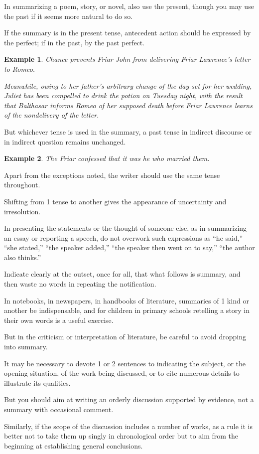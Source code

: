 \documentclass{book}
\numberwithin{equation}{section}
\newtheorem{example}{Example}[chapter]
\begin{document}
In summarizing a poem, story, or novel, also use the present, though you may use the past if it seems more natural to do so.

If the summary is in the present tense, antecedent action should be expressed by the perfect; if in the past, by the past perfect.
\begin{example}
    Chance prevents Friar John from delivering Friar Lawrence's letter to Romeo.
    
    Meanwhile, owing to her father's arbitrary change of the day set for her wedding, Juliet has been compelled to drink the potion on Tuesday night, with the result that Balthasar informs Romeo of her supposed death before Friar Lawrence learns of the nondelivery of the letter.
\end{example}
But whichever tense is used in the summary, a past tense in indirect discourse or in indirect question remains unchanged.
\begin{example}
    The Friar confessed that it was he who married them.
\end{example}
Apart from the exceptions noted, the writer should use the same tense throughout.

Shifting from 1 tense to another gives the appearance of uncertainty and irresolution.

%
In presenting the statements or the thought of someone else, as in summarizing an essay or reporting a speech, do not overwork such expressions as ``he said,'' ``she stated,'' ``the speaker added,'' ``the speaker then went on to say,'' ``the author also thinks.''

Indicate clearly at the outset, once for all, that what follows is summary, and then waste no words in repeating the notification.

%
In notebooks, in newspapers, in handbooks of literature, summaries of 1 kind or another be indispensable, and for children in primary schools retelling a story in their own words is a useful exercise.

But in the criticism or interpretation of literature, be careful to avoid dropping into summary.

It may be necessary to devote 1 or 2 sentences to indicating the subject, or the opening situation, of the work being discussed, or to cite numerous details to illustrate its qualities.

But you should aim at writing an orderly discussion supported by evidence, not a summary with occasional comment.

Similarly, if the scope of the discussion includes a number of works, as a rule it is better not to take them up singly in chronological order but to aim from the beginning at establishing general conclusions.
\end{document}
